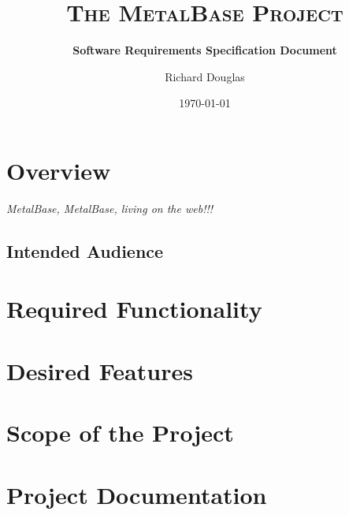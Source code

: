 \documentclass{article}[12pt,a4paper]
\title{\textsc{The MetalBase Project}}
\subtitle{\textbf{Software Requirements Specification Document}}
\author{\Large{Richard Douglas}}
\date{\today{}}
\newcommand{\MetalVoice}[1]{\textit{#1}}
\begin{document}
  \maketitle
  
  \section*{Overview}
  \MetalVoice{MetalBase, MetalBase, living on the web!!!} 
  
  \subsection*{Intended Audience}
  
  \tableofcontents
  
  \section{Required Functionality}
  
  \section{Desired Features}
  
  \section{Scope of the Project}
  
  \section{Project Documentation}
  
\end{document}
